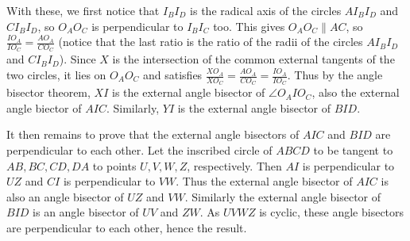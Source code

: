 \documentclass[11pt,a4paper]{article}
\begin{document}
\begin{enumerate}
    With these, we first notice that $I_BI_D$ is the radical axis of the circles $AI_BI_D$ and $CI_BI_D$, so $O_AO_C$ is perpendicular to $I_BI_C$ too. This gives $O_AO_C\parallel AC$, so $\frac{IO_A}{IO_C}=\frac{AO_A}{CO_C}$ (notice that the last ratio is the ratio of the radii of the circles $AI_BI_D$ and $CI_BI_D$). Since $X$ is the intersection of the common external tangents of the two circles, it lies on $O_AO_C$ and satisfies $\frac{XO_A}{XO_C}=\frac{AO_A}{CO_C}=\frac{IO_A}{IO_C}$. Thus by the angle bisector theorem, $XI$ is the external angle bisector of $\angle O_AIO_C$, also the external angle biector of $AIC$. Similarly, $YI$ is the external angle bisector of $BID$. 
    
    It then remains to prove that the external angle bisectors of $AIC$ and $BID$ are perpendicular to each other. Let the inscribed circle of $ABCD$ to be tangent to $AB, BC, CD, DA$ to points $U, V, W, Z$, respectively. Then $AI$ is perpendicular to $UZ$ and $CI$ is perpendicular to $VW$. Thus the external angle bisector of $AIC$ is also an angle bisector of $UZ$ and $VW$. Similarly the external angle bisector of $BID$ is an angle bisector of $UV$ and $ZW$. As $UVWZ$ is cyclic, these angle bisectors are perpendicular to each other, hence the result. 
	\end{enumerate}
\end{document}
